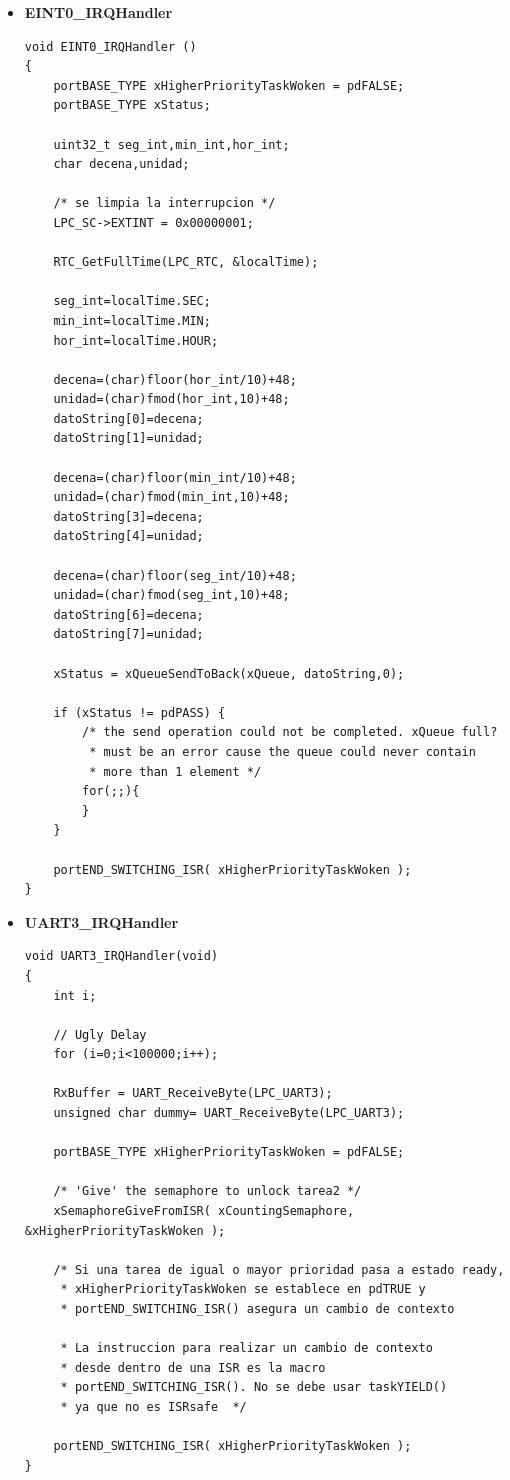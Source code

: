 \documentclass[a4paper,12pt]{article}
\begin{document}
\begin{itemize}

\item {\textbf{EINT0\_IRQHandler}}

\begin{verbatim}
void EINT0_IRQHandler ()
{
	portBASE_TYPE xHigherPriorityTaskWoken = pdFALSE;
	portBASE_TYPE xStatus;

	uint32_t seg_int,min_int,hor_int;
	char decena,unidad;

	/* se limpia la interrupcion */
	LPC_SC->EXTINT = 0x00000001;

	RTC_GetFullTime(LPC_RTC, &localTime);

	seg_int=localTime.SEC;
	min_int=localTime.MIN;
	hor_int=localTime.HOUR;

	decena=(char)floor(hor_int/10)+48;
	unidad=(char)fmod(hor_int,10)+48;
	datoString[0]=decena;
	datoString[1]=unidad;

	decena=(char)floor(min_int/10)+48;
	unidad=(char)fmod(min_int,10)+48;
	datoString[3]=decena;
	datoString[4]=unidad;

	decena=(char)floor(seg_int/10)+48;
	unidad=(char)fmod(seg_int,10)+48;
	datoString[6]=decena;
	datoString[7]=unidad;

	xStatus = xQueueSendToBack(xQueue, datoString,0);

	if (xStatus != pdPASS) {
		/* the send operation could not be completed. xQueue full?
		 * must be an error cause the queue could never contain
		 * more than 1 element */
		for(;;){
		}
	}
	
	portEND_SWITCHING_ISR( xHigherPriorityTaskWoken );
}
\end{verbatim}

\item {\textbf{UART3\_IRQHandler}}

\begin{verbatim}
void UART3_IRQHandler(void)
{
	int i;

	// Ugly Delay
	for (i=0;i<100000;i++);

	RxBuffer = UART_ReceiveByte(LPC_UART3);
	unsigned char dummy= UART_ReceiveByte(LPC_UART3);

	portBASE_TYPE xHigherPriorityTaskWoken = pdFALSE;

	/* 'Give' the semaphore to unlock tarea2 */
	xSemaphoreGiveFromISR( xCountingSemaphore, &xHigherPriorityTaskWoken );

	/* Si una tarea de igual o mayor prioridad pasa a estado ready, 
	 * xHigherPriorityTaskWoken se establece en pdTRUE y
	 * portEND_SWITCHING_ISR() asegura un cambio de contexto

	 * La instruccion para realizar un cambio de contexto 
	 * desde dentro de una ISR es la macro 
	 * portEND_SWITCHING_ISR(). No se debe usar taskYIELD()
	 * ya que no es ISRsafe	 */
	
	portEND_SWITCHING_ISR( xHigherPriorityTaskWoken );
}
\end{verbatim}

\end{itemize}
\end{document}
